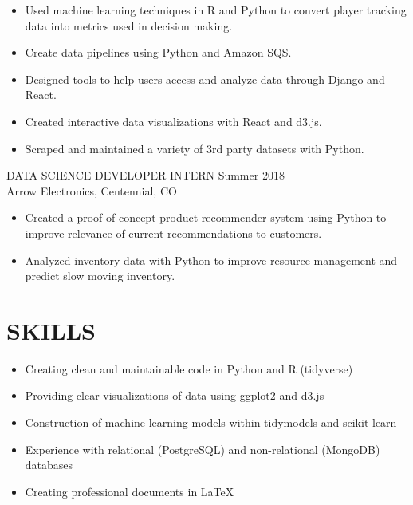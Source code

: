 \documentclass[11pt]{res} %
\begin{document}
\begin{resume}
\begin{itemize}
	\item Used machine learning techniques in R and Python to convert player tracking data into metrics used in decision making.
	\item Create data pipelines using Python and Amazon SQS.
	\item Designed tools to help users access and analyze data through Django and React.
	\item Created interactive data visualizations with React and d3.js.
	\item Scraped and maintained a variety of 3rd party datasets with Python.
\end{itemize}
\vspace{-0.15in}  
DATA SCIENCE DEVELOPER INTERN \hfill Summer 2018 \\
Arrow Electronics, Centennial, CO

\begin{itemize}
	\item Created a proof-of-concept product recommender system using Python to improve relevance of current recommendations to customers.
	\item Analyzed inventory data with Python to improve resource management and predict slow moving inventory.
\end{itemize}



\vspace{-0.2in}
\hrulefill
\vspace{-0.2in}  
\section{SKILLS}

\begin{itemize} 
	\item Creating clean and maintainable code in Python and R (tidyverse)
	\item Providing clear visualizations of data using ggplot2 and d3.js
	\item Construction of machine learning models within tidymodels and scikit-learn
	\item Experience with relational (PostgreSQL) and non-relational (MongoDB) databases
	\item Creating professional documents in \LaTeX
\end{itemize}


\end{resume}
\end{document}
